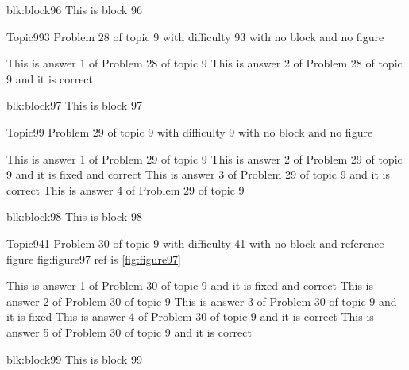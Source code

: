 \documentclass[master]{exam}
\begin{document}
\begin{block}{blk:block96}
This is block 96
\end{block}


\begin{problem}{Topic9}{93}
	Problem 28 of topic 9 with difficulty 93 with no block and no figure
	\begin{answers}
		\answer This is answer 1 of Problem 28 of topic 9 
		\answer[correct] This is answer 2 of Problem 28 of topic 9 and it is correct
	\end{answers}
\end{problem}



\begin{block}{blk:block97}
This is block 97
\end{block}


\begin{problem}{Topic9}{9}
	Problem 29 of topic 9 with difficulty 9 with no block and no figure
	\begin{answers}
		\answer This is answer 1 of Problem 29 of topic 9 
		 This is answer 2 of Problem 29 of topic 9 and it is fixed and correct
		\answer[correct] This is answer 3 of Problem 29 of topic 9 and it is correct
		\answer This is answer 4 of Problem 29 of topic 9 
	\end{answers}
\end{problem}



\begin{block}{blk:block98}
This is block 98
\end{block}


\begin{problem}{Topic9}{41}
	Problem 30 of topic 9 with difficulty 41 with no block and reference figure fig:figure97 ref is \ref{fig:figure97}
	\begin{answers}
		 This is answer 1 of Problem 30 of topic 9 and it is fixed and correct
		\answer This is answer 2 of Problem 30 of topic 9 
		\answer[fixed] This is answer 3 of Problem 30 of topic 9 and it is fixed
		\answer[correct] This is answer 4 of Problem 30 of topic 9 and it is correct
		\answer[correct] This is answer 5 of Problem 30 of topic 9 and it is correct
	\end{answers}
\end{problem}



\begin{block}{blk:block99}
This is block 99
\end{block}
\end{document}
